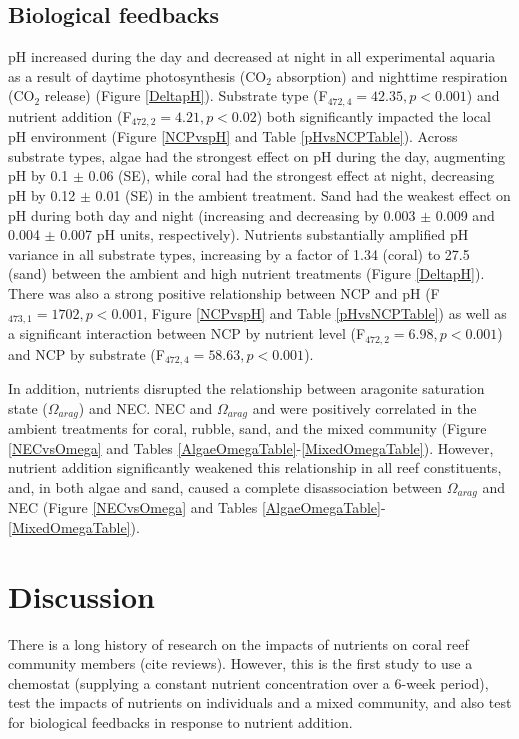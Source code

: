 \documentclass{article}%
\begin{document}
\subsection{Biological feedbacks}
pH increased during the day and decreased at night in all experimental aquaria as a result of daytime photosynthesis (CO$_2$ absorption) and nighttime respiration (CO$_2$ release) (Figure \ref{DeltapH}). Substrate type (F$_{472,4} = 42.35, p < 0.001$) and nutrient addition (F$_{472,2} = 4.21, p < 0.02$) both significantly impacted the local pH environment (Figure \ref{NCPvspH} and Table \ref{pHvsNCPTable}). Across substrate types, algae had the strongest effect on pH during the day, augmenting pH by 0.1 $\pm$ 0.06 (SE), while coral had the strongest effect at night, decreasing pH by 0.12 $\pm$ 0.01 (SE) in the ambient treatment. Sand had the weakest effect on pH during both day and night (increasing and decreasing by 0.003 $\pm$ 0.009 and 0.004 $\pm$ 0.007 pH units, respectively). Nutrients substantially amplified pH variance in all substrate types,  increasing by a factor of 1.34 (coral) to 27.5 (sand) between the ambient and high nutrient treatments (Figure \ref{DeltapH}). There was also a  strong positive relationship between NCP and pH (F$_{473,1} = 1702, p < 0.001$, Figure \ref{NCPvspH} and Table \ref{pHvsNCPTable}) as well as a significant interaction between NCP by nutrient level (F$_{472,2} = 6.98, p < 0.001$) and NCP by substrate (F$_{472,4} = 58.63, p < 0.001$).

\indent In addition, nutrients disrupted the relationship between aragonite saturation state ($\Omega_{arag}$) and NEC. NEC and  $\Omega_{arag}$ and were positively correlated in the ambient treatments for coral, rubble, sand, and the mixed community (Figure \ref{NECvsOmega} and Tables \ref{AlgaeOmegaTable}-\ref{MixedOmegaTable}). However, nutrient addition significantly weakened this relationship in all reef constituents, and, in both algae and sand, caused a complete disassociation between $\Omega_{arag}$ and NEC (Figure \ref{NECvsOmega} and Tables \ref{AlgaeOmegaTable}-\ref{MixedOmegaTable}).

\section{Discussion}
There is a long history of research on the impacts of nutrients on coral reef community members (cite reviews). However, this is the first study to use a chemostat (supplying a constant nutrient concentration over a 6-week period), test the impacts of nutrients on individuals and a mixed community, and also test for biological feedbacks in response to nutrient addition.
\end{document}
